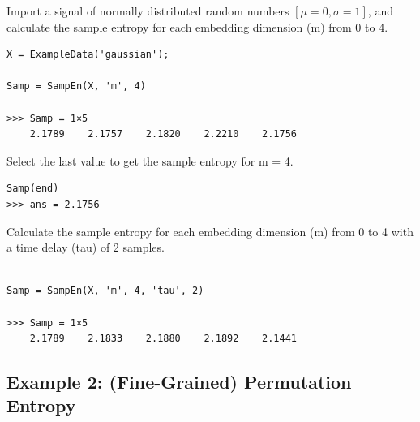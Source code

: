 \documentclass[12pt, a4paper, titlepage, openany]{book}
\begin{document}
Import a signal of normally distributed random numbers $[\mu = 0, \sigma = 1]$, and calculate the sample entropy for each embedding dimension (m) from 0 to 4.
\begin{verbatim}
X = ExampleData('gaussian');

Samp = SampEn(X, 'm', 4)

>>> Samp = 1×5
    2.1789    2.1757    2.1820    2.2210    2.1756
\end{verbatim}
Select the last value to get the sample entropy for m = 4.
\begin{verbatim}
Samp(end)
>>> ans = 2.1756
\end{verbatim}
Calculate the sample entropy for each embedding dimension (m) from 0 to 4 with a time delay (tau) of 2 samples.
\begin{verbatim}

Samp = SampEn(X, 'm', 4, 'tau', 2)

>>> Samp = 1×5
    2.1789    2.1833    2.1880    2.1892    2.1441
\end{verbatim}

\newpage
\subsection{\normalsize Example 2: \hspace{15mm} (Fine-Grained) Permutation Entropy}
\end{document}
